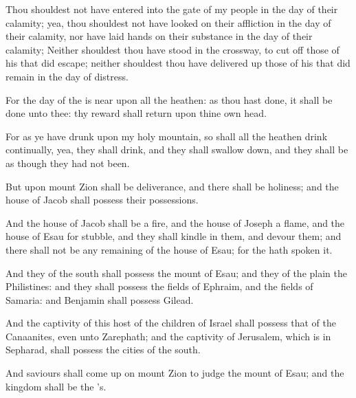 \verse Thou shouldest not have entered into the gate of my people in the day of their calamity; yea, thou shouldest not have looked on their affliction in the day of their calamity, nor have laid hands on their substance in the day of their calamity; \verse Neither shouldest thou have stood in the crossway, to cut off those of his that did escape; neither shouldest thou have delivered up those of his that did remain in the day of distress.

\verse For the day of the \LORD is near upon all the heathen: as thou hast done, it shall be done unto thee: thy reward shall return upon thine own head.

\verse For as ye have drunk upon my holy mountain, so shall all the heathen drink continually, yea, they shall drink, and they shall swallow down, and they shall be as though they had not been.

\verse But upon mount Zion shall be deliverance, and there shall be holiness; and the house of Jacob shall possess their possessions.

\verse And the house of Jacob shall be a fire, and the house of Joseph a flame, and the house of Esau for stubble, and they shall kindle in them, and devour them; and there shall not be any remaining of the house of Esau; for the \LORD hath spoken it.

\verse And they of the south shall possess the mount of Esau; and they of the plain the Philistines: and they shall possess the fields of Ephraim, and the fields of Samaria: and Benjamin shall possess Gilead.

\verse And the captivity of this host of the children of Israel shall possess that of the Canaanites, even unto Zarephath; and the captivity of Jerusalem, which is in Sepharad, shall possess the cities of the south.

\verse And saviours shall come up on mount Zion to judge the mount of Esau; and the kingdom shall be the \LORD's.

